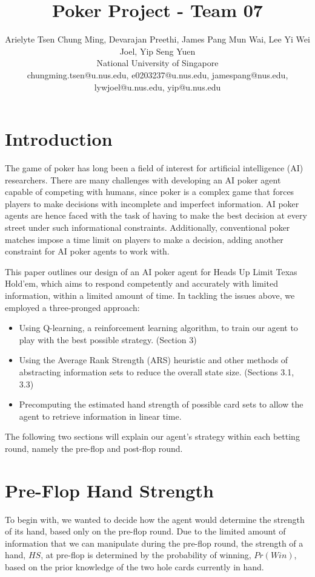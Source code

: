 \documentclass{article}
\title{Poker Project - Team 07}
\author{
Arielyte Tsen Chung Ming, Devarajan Preethi, James Pang Mun Wai, Lee Yi Wei Joel, Yip Seng Yuen
\\ 
National University of Singapore\\
%
chungming.tsen@u.nus.edu, e0203237@u.nus.edu, jamespang@nus.edu, lywjoel@u.nus.edu, yip@u.nus.edu
}
\begin{document}
\maketitle

\section{Introduction}

The game of poker has long been a field of interest for artificial intelligence (AI) researchers. There are many challenges with developing an AI poker agent capable of competing with humans, since poker is a complex game that forces players to make decisions with incomplete and imperfect information. AI poker agents are hence faced with the task of having to make the best decision at every street under such informational constraints. Additionally, conventional poker matches impose a time limit on players to make a decision, adding another constraint for AI poker agents to work with.

This paper outlines our design of an AI poker agent for Heads Up Limit Texas Hold’em, which aims to respond competently and accurately with limited information, within a limited amount of time. In tackling the issues above, we employed a three-pronged approach:

\begin{itemize}
  \item Using Q-learning, a reinforcement learning algorithm, to train our agent to play with the best possible strategy. (Section 3)
  \item Using the Average Rank Strength (ARS) heuristic and other methods of abstracting information sets to reduce the overall state size. (Sections 3.1, 3.3)
  \item Precomputing the estimated hand strength of possible card sets to allow the agent to retrieve information in linear time.
\end{itemize}

The following two sections will explain our agent’s strategy within each betting round, namely the pre-flop and post-flop round.
\section{Pre-Flop Hand Strength}

To begin with, we wanted to decide how the agent would determine the strength of its hand, based only on the pre-flop round. Due to the limited amount of information that we can manipulate during the pre-flop round, the strength of a hand, $HS$, at pre-flop is determined by the probability of winning, $Pr(Win)$, based on the prior knowledge of the two hole cards currently in hand. 
\end{document}
